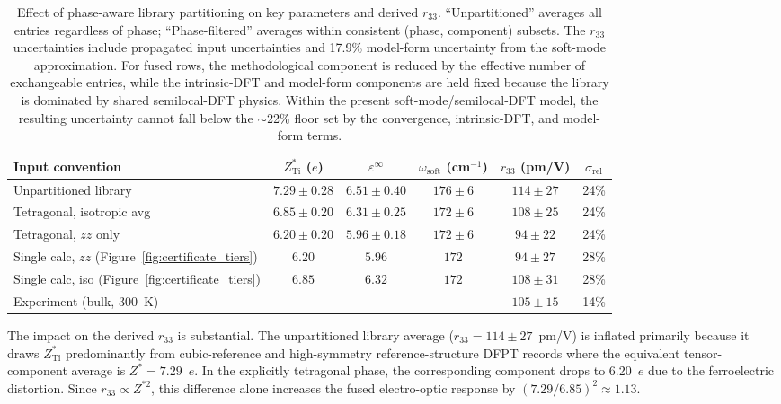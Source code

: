 \documentclass[twocolumn,superscriptaddress,amsmath,amssymb,longbibliography]{revtex4-2}
\begin{document}
\begin{table}
\centering
\caption{Effect of phase-aware library partitioning on key parameters
and derived $r_{33}$. ``Unpartitioned'' averages all entries regardless of
phase; ``Phase-filtered'' averages within consistent (phase, component)
subsets. The $r_{33}$ uncertainties include propagated input uncertainties
and 17.9\% model-form uncertainty from the soft-mode approximation. For fused rows, the methodological component is reduced by the effective number of exchangeable entries, while the intrinsic-DFT and model-form components are held fixed because the library is dominated by shared semilocal-DFT physics. Within the present soft-mode/semilocal-DFT model, the resulting uncertainty cannot fall below the $\sim$22\% floor set by the convergence, intrinsic-DFT, and model-form terms.}
\label{tab:library_update}
\begin{tabular}{lccccc}
\toprule
Input convention & $Z^*_{\mathrm{Ti}}$ ($e$) & $\varepsilon^\infty$ & $\omega_{\mathrm{soft}}$ (cm$^{-1}$) & $r_{33}$ (pm/V) & $\sigma_{\mathrm{rel}}$ \\
\midrule
Unpartitioned library & \;\;$7.29 \pm 0.28$ \;\; & $6.51 \pm 0.40$ & $176 \pm 6$ & $114 \pm 27$ & 24\% \\
Tetragonal, isotropic avg & \;\;$6.85 \pm 0.20$ \;\;& $6.31 \pm 0.25$ & $172 \pm 6$ & $108 \pm 25$ & 24\% \\
Tetragonal, $zz$ only & \;\;$6.20 \pm 0.20$ \;\;& $5.96 \pm 0.18$ & $172 \pm 6$ & $94 \pm 22$ & 24\% \\
Single calc, $zz$ (Figure~\ref{fig:certificate_tiers}) & $6.20$ & $5.96$ & $172$ & $94 \pm 27$ & 28\% \\
Single calc, iso (Figure~\ref{fig:certificate_tiers}) & $6.85$ & $6.32$ & $172$ & $108 \pm 31$ & 28\% \\
\midrule
Experiment (bulk, 300~K) & --- & --- & --- & $105 \pm 15$ & 14\% \\
\bottomrule
\end{tabular}
\end{table}

The impact on the derived $r_{33}$ is substantial. The unpartitioned library
average ($r_{33} = 114 \pm 27$~pm/V) is inflated primarily because it draws
$Z^*_{\mathrm{Ti}}$ predominantly from cubic-reference and high-symmetry
reference-structure DFPT records \cite{Ghosez1998_BEC,Zhong1994_BTO,Veithen2005} where the equivalent tensor-component average is $Z^* = 7.29$~$e$. In the explicitly tetragonal phase, the
 corresponding component drops to 6.20~$e$ due to the ferroelectric distortion.
Since $r_{33} \propto Z^{*2}$, this difference alone increases the
fused electro-optic response by  $(7.29/6.85)^2 \approx 1.13$.
\end{document}
